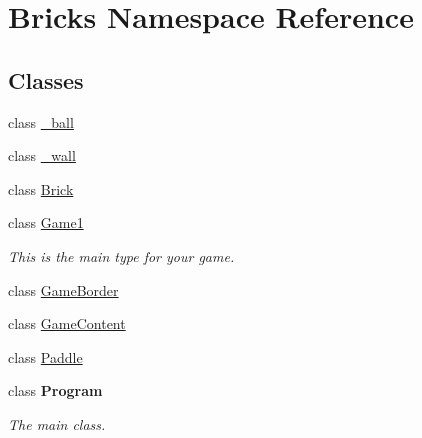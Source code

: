 \hypertarget{namespace_bricks}{}\section{Bricks Namespace Reference}
\label{namespace_bricks}
\subsection*{Classes}
\begin{DoxyCompactItemize}
\item 
class \mbox{\hyperlink{class_bricks_1_1__ball}{\+\_\+ball}}
\item 
class \mbox{\hyperlink{class_bricks_1_1__wall}{\+\_\+wall}}
\item 
class \mbox{\hyperlink{class_bricks_1_1_brick}{Brick}}
\item 
class \mbox{\hyperlink{class_bricks_1_1_game1}{Game1}}
\begin{DoxyCompactList}\small\item\em This is the main type for your game. \end{DoxyCompactList}\item 
class \mbox{\hyperlink{class_bricks_1_1_game_border}{Game\+Border}}
\item 
class \mbox{\hyperlink{class_bricks_1_1_game_content}{Game\+Content}}
\item 
class \mbox{\hyperlink{class_bricks_1_1_paddle}{Paddle}}
\item 
class {\bfseries Program}
\begin{DoxyCompactList}\small\item\em The main class. \end{DoxyCompactList}\end{DoxyCompactItemize}
